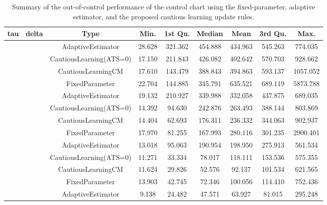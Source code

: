 \begin{table}[!h]

\caption{Summary of the out-of-control performance of the control chart using the fixed-parameter, adaptive estimator, and the proposed cautious learning update rules.}
\centering
\begin{tabular}[t]{ccccccccc}
\toprule
tau & delta & Type & Min. & 1st Qu. & Median & Mean & 3rd Qu. & Max.\\
\midrule
 &  & AdaptiveEstimator & 28.628 & 321.362 & 454.888 & 434.963 & 545.263 & 774.035\\

 &  & CautiousLearning(ATS=0) & 17.150 & 211.843 & 426.082 & 402.642 & 570.703 & 928.662\\

 &  & CautiousLearningCM & 17.610 & 143.479 & 388.843 & 394.863 & 593.137 & 1057.052\\

 & \multirow[t]{-4}{*}{\centering\arraybackslash 0.25} & FixedParameter & 22.704 & 144.885 & 345.791 & 635.521 & 689.119 & 5873.788\\
\cmidrule{2-9}
 &  & AdaptiveEstimator & 19.132 & 210.927 & 339.988 & 332.058 & 437.875 & 689.035\\

 &  & CautiousLearning(ATS=0) & 14.392 & 94.630 & 242.876 & 263.493 & 388.144 & 803.869\\

 &  & CautiousLearningCM & 14.404 & 62.693 & 176.311 & 236.332 & 344.063 & 902.937\\

 & \multirow[t]{-4}{*}{\centering\arraybackslash 0.35} & FixedParameter & 17.970 & 81.255 & 167.993 & 280.116 & 301.235 & 2900.401\\
\cmidrule{2-9}
 &  & AdaptiveEstimator & 13.018 & 95.063 & 190.954 & 198.950 & 275.913 & 561.534\\

 &  & CautiousLearning(ATS=0) & 11.271 & 33.334 & 78.017 & 118.111 & 153.536 & 575.355\\

 &  & CautiousLearningCM & 11.624 & 29.826 & 52.576 & 92.137 & 101.534 & 621.565\\

 & \multirow[t]{-4}{*}{\centering\arraybackslash 0.50} & FixedParameter & 13.903 & 42.745 & 72.346 & 100.056 & 114.410 & 752.436\\
\cmidrule{2-9}
 &  & AdaptiveEstimator & 9.138 & 24.482 & 47.571 & 63.927 & 81.015 & 295.248\\


\end{tabular}
\end{table}

